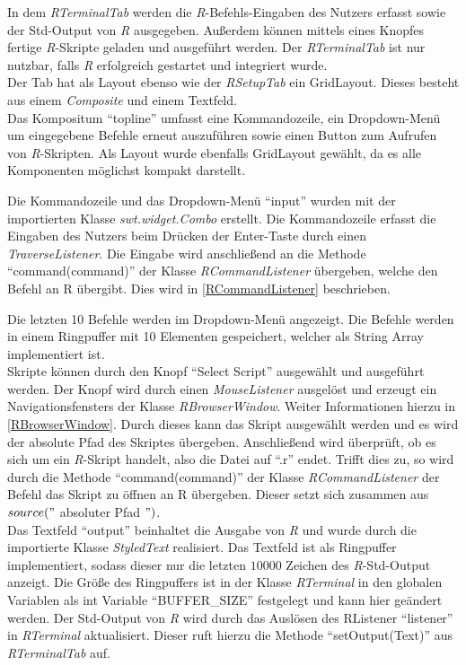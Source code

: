 \documentclass[a4paper, 12pt]{report} %
\begin{document}
In dem \textit{RTerminalTab} werden die \textit{R}-Befehls-Eingaben des Nutzers erfasst sowie der Std-Output von \textit{R} ausgegeben. Außerdem können mittels eines Knopfes fertige \textit{R}-Skripte geladen und ausgeführt werden. Der \textit{RTerminalTab} ist nur nutzbar, falls \textit{R} erfolgreich gestartet und integriert wurde.\\

Der Tab hat als Layout ebenso wie der \textit{RSetupTab} ein GridLayout.
Dieses besteht aus einem \textit{Composite} und einem Textfeld.\\

Das Kompositum "`topline"' umfasst eine Kommandozeile, ein Dropdown-Menü um eingegebene Befehle erneut auszuführen sowie einen Button zum Aufrufen von \textit{R}-Skripten. Als Layout wurde ebenfalls GridLayout gewählt, da es alle Komponenten möglichst kompakt darstellt.

Die Kommandozeile und das Dropdown-Menü "`input"' wurden mit der importierten Klasse \textit{swt.widget.Combo} erstellt. Die Kommandozeile erfasst die Eingaben des Nutzers beim Drücken der Enter-Taste durch einen \textit{TraverseListener}. Die Eingabe wird anschließend an die Methode "`command(command)"' der Klasse  \textit{RCommandListener} übergeben, welche den Befehl an R übergibt. Dies wird in \ref{RCommandListener} beschrieben.

Die letzten 10 Befehle werden im Dropdown-Menü angezeigt. Die Befehle werden in einem Ringpuffer mit 10 Elementen gespeichert, welcher als String Array implementiert ist.\\

Skripte können durch den Knopf "`Select Script"' ausgewählt und ausgeführt werden. Der Knopf wird durch einen \textit{MouseListener} ausgelöst und erzeugt ein Navigationsfensters der Klasse \textit{RBrowserWindow}. Weiter Informationen hierzu in \ref{RBrowserWindow}. Durch dieses kann das Skript ausgewählt werden und es wird der absolute Pfad des Skriptes übergeben. Anschließend wird überprüft, ob es sich um ein \textit{R}-Skript handelt, also die Datei auf "`.r"' endet. Trifft dies zu, so wird durch die Methode "`command(command)"' der Klasse  \textit{RCommandListener} der Befehl das Skript zu öffnen an R übergeben. Dieser setzt sich zusammen aus $source("$  absoluter Pfad $")$. \\

Das Textfeld "`output"' beinhaltet die Ausgabe von \textit{R} und wurde durch die importierte Klasse \textit{StyledText} realisiert. Das Textfeld ist als Ringpuffer implementiert, sodass dieser nur die letzten $10000$ Zeichen des \textit{R}-Std-Output anzeigt. Die Größe des Ringpuffers ist in der Klasse \textit{RTerminal} in den globalen Variablen als int Variable "`BUFFER\_SIZE"' festgelegt und kann hier geändert werden.
Der Std-Output von \textit{R} wird durch das Auslösen des RListener "`listener"' in \textit{RTerminal} aktualisiert. Dieser ruft hierzu die Methode "`setOutput(Text)"' aus \textit{RTerminalTab} auf.\\
\end{document}
